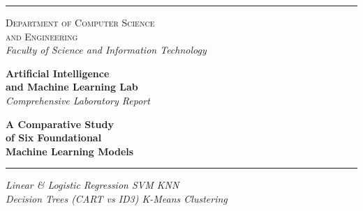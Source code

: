 \documentclass[11pt,a4paper]{article}
\begin{document}
\begin{titlepage}
\thispagestyle{empty}
\enlargethispage{2cm}
\begin{center}

{\color{accent}\rule[0.5ex]{2.5cm}{1.5pt}}

\vspace{1.0cm}

{\color{primary}\Large\scshape Department of Computer Science} \\[3pt]
{\color{primary}\Large\scshape and Engineering} \\[4pt]
{\color{primary!70!black}\normalsize\itshape Faculty of Science and Information Technology}

\vspace{0.6cm}

{\color{primary!80!black}\large\bfseries Artificial Intelligence} \\[2pt]
{\color{primary!80!black}\large\bfseries and Machine Learning Lab} \\[2pt]
{\color{primary!70!black}\normalsize\itshape Comprehensive Laboratory Report}

\vspace{2.0cm}

{\color{primary}\Huge\bfseries A Comparative Study} \\[8pt]
{\color{primary}\Huge\bfseries of Six Foundational} \\[8pt]
{\color{primary}\Huge\bfseries Machine Learning Models}

\vspace{0.5cm}

{\color{accent}\rule{0.45\linewidth}{1.5pt}}

\vspace{0.4cm}

{\color{primary!80!black}\large\itshape
    Linear \& Logistic Regression \textbullet{} SVM \textbullet{} KNN} \\[3pt]
{\color{primary!80!black}\large\itshape
    Decision Trees (CART vs ID3) \textbullet{} K-Means Clustering}

\vspace{1.8cm}


\end{center}
\end{titlepage}
\end{document}
